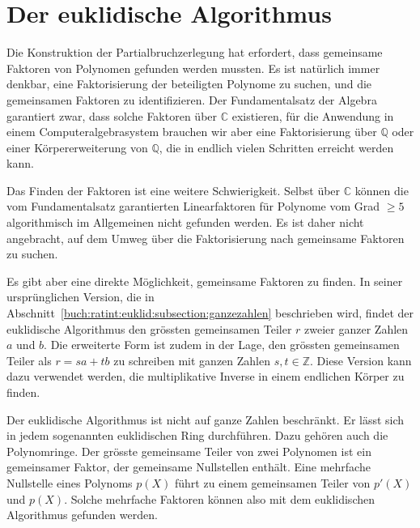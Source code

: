 %
%
%
\section{Der euklidische Algorithmus
\label{buch:ratint:section:euklid}}
%
Die Konstruktion der Partialbruchzerlegung hat erfordert, dass gemeinsame
Faktoren von Polynomen gefunden werden mussten.
Es ist natürlich immer denkbar, eine Faktorisierung der beteiligten
Polynome zu suchen, und die gemeinsamen Faktoren zu identifizieren.
Der Fundamentalsatz der Algebra garantiert zwar, dass solche
Faktoren über $\mathbb{C}$ existieren, für die Anwendung in einem
Computeralgebrasystem brauchen wir aber eine Faktorisierung über
$\mathbb{Q}$ oder einer Körpererweiterung von $\mathbb{Q}$, die in
endlich vielen Schritten erreicht werden kann.

Das Finden der Faktoren ist eine weitere Schwierigkeit.
Selbst über $\mathbb{C}$ können die vom Fundamentalsatz garantierten
Linearfaktoren für Polynome vom Grad $\ge 5$ algorithmisch im
Allgemeinen nicht gefunden werden.
Es ist daher nicht angebracht, auf dem Umweg über die Faktorisierung
nach gemeinsame Faktoren zu suchen.

Es gibt aber eine direkte Möglichkeit, gemeinsame Faktoren zu finden.
In seiner ursprünglichen Version, die in
Abschnitt~\ref{buch:ratint:euklid:subsection:ganzezahlen}
beschrieben wird, findet der euklidische Algorithmus den grössten
gemeinsamen Teiler $r$ zweier ganzer Zahlen $a$ und $b$.
Die erweiterte Form ist zudem in der Lage, den grössten gemeinsamen
Teiler als $r=sa+tb$ zu schreiben mit ganzen Zahlen $s,t\in\mathbb{Z}$.
Diese Version kann dazu verwendet werden, die multiplikative Inverse 
in einem endlichen Körper zu finden.

Der euklidische Algorithmus ist nicht auf ganze Zahlen beschränkt.
Er lässt sich in jedem sogenannten euklidischen Ring durchführen.
Dazu gehören auch die Polynomringe.
Der grösste gemeinsame Teiler von zwei Polynomen ist ein gemeinsamer
Faktor, der gemeinsame Nullstellen enthält.
Eine mehrfache Nullstelle eines Polynoms $p(X)$ führt zu einem gemeinsamen
Teiler von $p'(X)$ und $p(X)$.
Solche mehrfache Faktoren können also mit dem euklidischen Algorithmus
gefunden werden.





